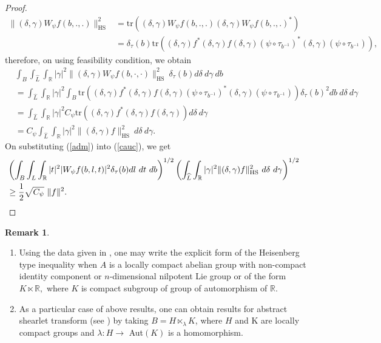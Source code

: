 \documentclass[11pt,reqno]{amsart}
\numberwithin{equation}{section}
\theoremstyle{definition}
\newtheorem{thm}{\sc Theorem}[section]
\newtheorem{rem}[thm]{\sc Remark}
\begin{document}
\begin{proof}
\begin{align*}
 \|(\delta,\gamma)W_{\psi}f(b,.,.)\|_{\text{HS}}^2 & = \text{tr}((\delta,\gamma)W_{\psi}f(b,.,.)(\delta,\gamma)W_{\psi}f(b,.,.)^*)\\
 &= \delta_{\tau}(b)\text{tr}((\delta,\gamma)f^*(\delta,\gamma)f(\delta,\gamma)(\psi \circ \tau_{b^{-1}})^*(\delta,\gamma)(\psi \circ \tau_{b^{-1}})),
 \end{align*}
 therefore, on using feasibility condition, we obtain
 \begin{align}\label{adm}
& \int_B\int_{\widehat{L}}\int_{\mathbb{R}}|\gamma|^2\|(\delta, \gamma)W_{\psi}f(b,\cdot,\cdot)\|_{\text{HS}}^2\  \delta_{\tau}(b) d\delta\ d\gamma\ db\nonumber\\
& = \int_{\widehat{L}}\int_{\mathbb{R}}|\gamma|^2\int_B \text{tr}((\delta,\gamma)f^*(\delta,\gamma)f(\delta,\gamma)(\psi \circ \tau_{b^{-1}})^*(\delta,\gamma)(\psi \circ \tau_{b^{-1}}))\delta_{\tau}(b)^2 db\ d\delta\ d\gamma\nonumber \\
 &=\int_{\widehat{L}}\int_{\mathbb{R}}|\gamma|^2C_{\psi}\text{tr}((\delta,\gamma)f^*(\delta,\gamma)f(\delta,\gamma))d\delta\ d\gamma \nonumber \\
 &= C_{\psi}\int_{\widehat{L}}\int_{\mathbb{R}}|\gamma|^2\|(\delta,\gamma)f\|_{\text{HS}}^2\ d\delta\ d\gamma.
 \end{align}
 On substituting (\ref{adm}) into (\ref{cauc}), we get 
 \begin{align*}
 &\left(\int_B\int_{L}\int_{\mathbb{R}}|t|^2|W_{\psi}f(b,l,t)|^2 \delta_{\tau}(b) dl\ dt\ db\right)^{1/2}
\left( \int_{\widehat{L}}\int_{\mathbb{R}}|\gamma|^2\|(\delta,\gamma)f\|_{\text{HS}}^2\ d\delta\ d\gamma\right)^{1/2} &\\
& \geq\frac{1}{2}\sqrt{C_{\psi}}\ \|f\|^2. &\qedhere 
\end{align*}
\end{proof}
\begin{rem}
\begin{enumerate}
\item[(i)] Using the data given in \cite{bans;15}, one may write the explicit form of the Heisenberg type inequality when  $A$ is a locally compact abelian group with non-compact identity component  or $n$-dimensional nilpotent Lie group or of the form $K\ltimes \mathbb{R},$ where $K$ is compact subgroup of  group of automorphism of $\mathbb{R}$.

\item[(ii)] As a particular case of above results, one can obtain results for abstract shearlet transform (see \cite{kam:15}) by taking $B= H\ltimes_{\lambda}K$, where $H$ and K are locally compact groups and $\lambda:H\to $ Aut$(K)$ is a homomorphism.
\end{enumerate}
\end{rem}
\end{document}
